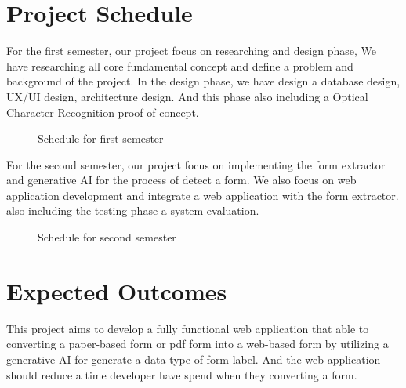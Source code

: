 \documentclass[12pt,oneside,openright,a4paper]{cpe-english-project}
\begin{document}
\section{Project Schedule}
For the first semester, our project focus on researching and design phase, We have researching all core fundamental concept and define a problem and background of the project. In the design phase, we have design a database design, UX/UI design, architecture design. And this phase also including a Optical Character Recognition proof of concept.

\begin{figure}[H]
\centering
{}
\caption{Schedule for first semester}\label{fig:figure-1.1}
\end{figure}

For the second semester, our project focus on implementing the form extractor and generative AI for the process of detect a form. We also focus on web application development and integrate a web application with the form extractor. also including the testing phase a system evaluation.

\begin{figure}[H]
\centering
{}
\caption{Schedule for second semester}\label{fig:figure-1.2}
\end{figure}

\section{Expected Outcomes}
This project aims to develop a fully functional web application that able to converting a paper-based form or pdf form into a web-based form by utilizing a generative AI for generate a data type of form label. And the web application should reduce a time developer have spend when they converting a form.
\end{document}
